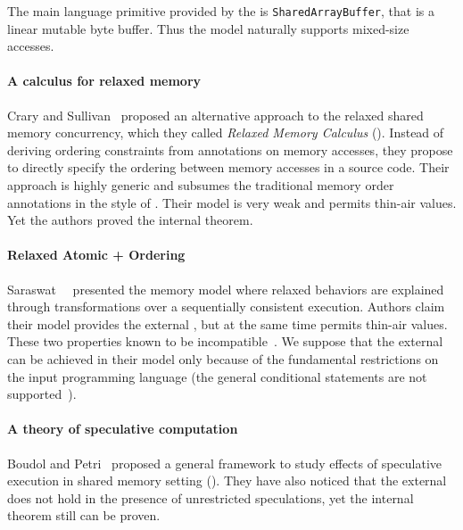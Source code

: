 The main language primitive provided by the \JSMM
is \texttt{SharedArrayBuffer}, that is a linear mutable byte buffer.
Thus the model naturally supports mixed-size accesses.

\paragraph{A calculus for relaxed memory}

Crary and Sullivan~\cite{Crary-Sullivan:POPL15} proposed 
an alternative approach to the relaxed shared memory concurrency,
which they called \emph{Relaxed Memory Calculus} (\RMC).
Instead of deriving ordering constraints from annotations 
on memory accesses, they propose to directly specify 
the ordering between memory accesses in a source code. 
Their approach is highly generic and subsumes 
the traditional memory order annotations in the style of \CMM.
Their model is very weak and permits thin-air values. 
Yet the authors proved the internal \DRF theorem.

\paragraph{Relaxed Atomic + Ordering}

Saraswat~\etal~\cite{Saraswat-al:PPoPP07} presented the \RAO memory model
where relaxed behaviors are explained through transformations 
over a sequentially consistent execution.
Authors claim their model provides the external \DRF,
but at the same time permits thin-air values. 
These two properties known to be incompatible~\cite{Batty-al:ESOP15}.
We suppose that the external \DRF can be achieved in their model 
only because of the fundamental restrictions on the input programming language 
(\eg the general conditional statements are not supported~\cite{PichonPharabod-Sewell:POPL16}). 

\paragraph{A theory of speculative computation}

Boudol and Petri~\cite{Boudol-Petri:ESOP10} proposed a general 
framework to study effects of speculative execution in
shared memory setting (\TSC). 
They have also noticed that the external \DRF does not 
hold in the presence of unrestricted speculations, 
yet the internal \DRF theorem still can be proven. 
